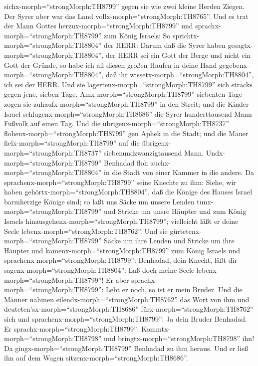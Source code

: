 sichx-morph=``strongMorph:TH8799'' gegen sie wie zwei kleine Herden
Ziegen. Der Syrer aber war das Land vollx-morph=``strongMorph:TH8765''.
 Und es trat der Mann Gottes
herzux-morph=``strongMorph:TH8799'' und
sprachx-morph=``strongMorph:TH8799'' zum König Israels: So
sprichtx-morph=``strongMorph:TH8804'' der HERR: Darum daß die Syrer
haben gesagtx-morph=``strongMorph:TH8804'', der HERR sei ein Gott der
Berge und nicht ein Gott der Gründe, so habe ich all diesen großen
Haufen in deine Hand gegebenx-morph=``strongMorph:TH8804'', daß ihr
wissetx-morph=``strongMorph:TH8804'', ich sei der HERR. 
Und sie lagertenx-morph=``strongMorph:TH8799'' sich stracks gegen jene,
sieben Tage. Amx-morph=``strongMorph:TH8799'' siebenten Tage zogen sie
zuhaufx-morph=``strongMorph:TH8799'' in den Streit; und die Kinder
Israel schlugenx-morph=``strongMorph:TH8686'' die Syrer hunderttausend
Mann Fußvolk auf einen Tag.  Und die
übrigenx-morph=``strongMorph:TH8737''
flohenx-morph=``strongMorph:TH8799'' gen Aphek in die Stadt; und die
Mauer fielx-morph=``strongMorph:TH8799'' auf die
übrigenx-morph=``strongMorph:TH8737'' siebenundzwanzigtausend Mann.
Undx-morph=``strongMorph:TH8799'' Benhadad floh
auchx-morph=``strongMorph:TH8804'' in die Stadt von einer Kammer in die
andere.  Da sprachenx-morph=``strongMorph:TH8799'' seine
Knechte zu ihm: Siehe, wir haben gehörtx-morph=``strongMorph:TH8804'',
daß die Könige des Hauses Israel barmherzige Könige sind; so laßt uns
Säcke um unsere Lenden tunx-morph=``strongMorph:TH8799'' und Stricke um
unsre Häupter und zum König Israels
hinausgehenx-morph=``strongMorph:TH8799''; vielleicht läßt er deine
Seele lebenx-morph=``strongMorph:TH8762''.  Und sie
gürtetenx-morph=``strongMorph:TH8799'' Säcke um ihre Lenden und Stricke
um ihre Häupter und kamenx-morph=``strongMorph:TH8799'' zum König
Israels und sprachenx-morph=``strongMorph:TH8799'': Benhadad, dein
Knecht, läßt dir sagenx-morph=``strongMorph:TH8804'': Laß doch meine
Seele lebenx-morph=``strongMorph:TH8799''! Er aber
sprachx-morph=``strongMorph:TH8799'': Lebt er noch, so ist er mein
Bruder.  Und die Männer nahmen
eilendx-morph=``strongMorph:TH8762'' das Wort von ihm und
deuteten'sx-morph=``strongMorph:TH8686''
fürx-morph=``strongMorph:TH8762'' sich und
sprachenx-morph=``strongMorph:TH8799'': Ja dein Bruder Benhadad. Er
sprachx-morph=``strongMorph:TH8799'':
Kommtx-morph=``strongMorph:TH8798'' und
bringtx-morph=``strongMorph:TH8798'' ihn! Da
gingx-morph=``strongMorph:TH8799'' Benhadad zu ihm heraus. Und er ließ
ihn auf dem Wagen sitzenx-morph=``strongMorph:TH8686''. 
